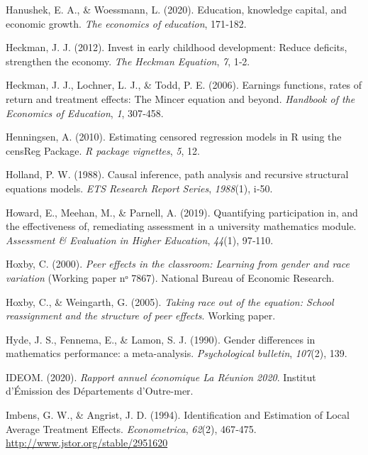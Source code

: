 \documentclass[
]{book}
\newlength{\cslhangindent}
\newlength{\cslentryspacingunit} %
\newenvironment{CSLReferences}[2] %
 {%
  \setlength{\parindent}{0pt}
  \ifodd #1
  \let\oldpar\par
  \def\par{\hangindent=\cslhangindent\oldpar}
  \fi
  \setlength{\parskip}{#2\cslentryspacingunit}
 }%
 {}
\begin{document}
\begin{CSLReferences}{1}{2}
\leavevmode{}%
Hanushek, E. A., \& Woessmann, L. (2020). Education, knowledge capital, and economic growth. \emph{The economics of education}, 171‑182.

\leavevmode{}%
Heckman, J. J. (2012). Invest in early childhood development: Reduce deficits, strengthen the economy. \emph{The Heckman Equation}, \emph{7}, 1‑2.

\leavevmode{}%
Heckman, J. J., Lochner, L. J., \& Todd, P. E. (2006). Earnings functions, rates of return and treatment effects: The Mincer equation and beyond. \emph{Handbook of the Economics of Education}, \emph{1}, 307‑458.

\leavevmode{}%
Henningsen, A. (2010). Estimating censored regression models in R using the censReg Package. \emph{R package vignettes}, \emph{5}, 12.

\leavevmode{}%
Holland, P. W. (1988). Causal inference, path analysis and recursive structural equations models. \emph{ETS Research Report Series}, \emph{1988}(1), i‑50.

\leavevmode{}%
Howard, E., Meehan, M., \& Parnell, A. (2019). Quantifying participation in, and the effectiveness of, remediating assessment in a university mathematics module. \emph{Assessment \& Evaluation in Higher Education}, \emph{44}(1), 97‑110.

\leavevmode{}%
Hoxby, C. (2000). \emph{Peer effects in the classroom: Learning from gender and race variation} (Working paper nᵒ 7867). National Bureau of Economic Research.

\leavevmode{}%
Hoxby, C., \& Weingarth, G. (2005). \emph{Taking race out of the equation: School reassignment and the structure of peer effects}. Working paper.

\leavevmode{}%
Hyde, J. S., Fennema, E., \& Lamon, S. J. (1990). Gender differences in mathematics performance: a meta-analysis. \emph{Psychological bulletin}, \emph{107}(2), 139.

\leavevmode{}%
IDEOM. (2020). \emph{Rapport annuel économique La Réunion 2020}. Institut d'Émission des Départements d'Outre-mer.

\leavevmode{}%
Imbens, G. W., \& Angrist, J. D. (1994). Identification and Estimation of Local Average Treatment Effects. \emph{Econometrica}, \emph{62}(2), 467‑475. \url{http://www.jstor.org/stable/2951620}


\end{CSLReferences}
\end{document}
